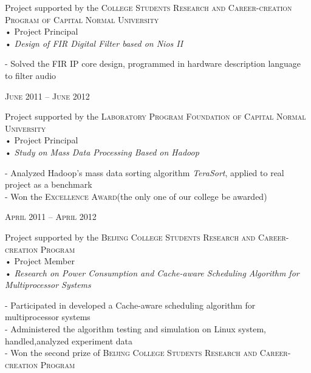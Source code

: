 \documentclass[10pt]{article} %
\begin{document}
\begin{minipage}[t]{0.5\textwidth}
{\raggedright Project supported by the \textsc{College Students Research and Career-creation Program of Capital Normal University}\\
 • Project Principal\\
 • \textit{Design of FIR Digital Filter based on Nios II}\\}

\normalsize{
-  Solved the FIR IP core design, programmed in hardware description language to filter audio 
}\\

{\raggedleft\textsc{June 2011 -- June 2012}\par}

{\raggedright Project supported by the \textsc{Laboratory Program Foundation of Capital Normal University}\\
 • Project Principal\\
 • \textit{Study on Mass Data Processing Based on Hadoop}\\}

\normalsize{
-  Analyzed Hadoop's mass data sorting algorithm \textit{TeraSort}, applied to real project as a benchmark\\
-  Won the \textsc{Excellence Award}(the only one of our college be awarded)}\\


{\raggedleft\textsc{April 2011 -- April 2012}\par}

{\raggedright Project supported by the \textsc{Beijing College Students Research and Career-creation Program} \\
 • Project Member\\
 • \textit{Research on Power Consumption and Cache-aware Scheduling Algorithm for Multiprocessor Systems}\\}

\normalsize{
-  Participated in developed  a Cache-aware scheduling algorithm for multiprocessor systems\\
-  Administered the algorithm testing and simulation on Linux system, handled,analyzed experiment data\\
-  Won the second prize of \textsc{Beijing College Students Research and Career-creation Program}
}\\


\end{minipage}
\end{document}
